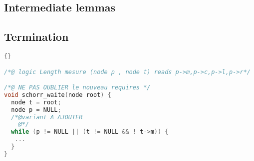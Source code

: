 \subsection{Intermediate lemmas}

\subsection{Termination}

\begin{lstlisting}[language=C]{}

/*@ logic Length mesure (node p , node t) reads p->m,p->c,p->l,p->r*/

/*@ NE PAS OUBLIER le nouveau requires */
void schorr_waite(node root) {
  node t = root;
  node p = NULL;
  /*@variant A AJOUTER
    @*/
  while (p != NULL || (t != NULL && ! t->m)) {
   ...
  }
}
\end{lstlisting}

